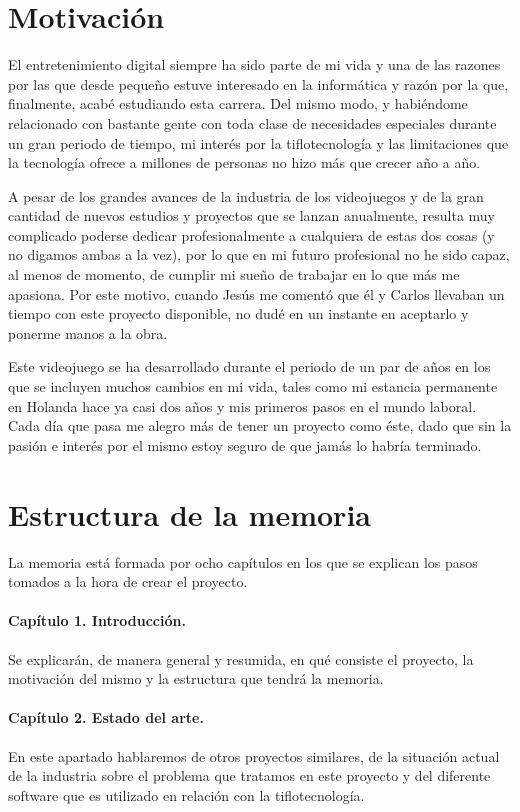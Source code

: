 \section{Motivación}
El entretenimiento digital siempre ha sido parte de mi vida y una de las razones por las que desde pequeño estuve interesado en la informática y razón por la que, finalmente, acabé estudiando esta carrera. Del mismo modo, y habiéndome relacionado con bastante gente con toda clase de necesidades especiales durante un gran periodo de tiempo, mi interés por la tiflotecnología y las limitaciones que la tecnología ofrece a millones de personas no hizo más que crecer año a año.

A pesar de los grandes avances de la industria de los videojuegos y de la gran cantidad de nuevos estudios y proyectos que se lanzan anualmente, resulta muy complicado poderse dedicar profesionalmente a cualquiera de estas dos cosas (y no digamos ambas a la vez), por lo que en mi futuro profesional no he sido capaz, al menos de momento, de cumplir mi sueño de trabajar en lo que más me apasiona. Por este motivo, cuando Jesús me comentó que él y Carlos llevaban un tiempo con este proyecto disponible, no dudé en un instante en aceptarlo y ponerme manos a la obra.

Este videojuego se ha desarrollado durante el periodo de un par de años en los que se incluyen muchos cambios en mi vida, tales como mi estancia permanente en Holanda hace ya casi dos años y mis primeros pasos en el mundo laboral. Cada día que pasa me alegro más de tener un proyecto como éste, dado que sin la pasión e interés por el mismo estoy seguro de que jamás lo habría terminado.

\section{Estructura de la memoria}

La memoria está formada por ocho capítulos en los que se explican los pasos tomados a la hora de crear el proyecto.

\paragraph*{Capítulo 1. Introducción.}
Se explicarán, de manera general y resumida, en qué consiste el proyecto, la motivación del mismo y la estructura que tendrá la memoria.

\paragraph*{Capítulo 2. Estado del arte.}
En este apartado hablaremos de otros proyectos similares, de la situación actual de la industria sobre el problema que tratamos en este proyecto y del diferente software que es utilizado en relación con la tiflotecnología.


